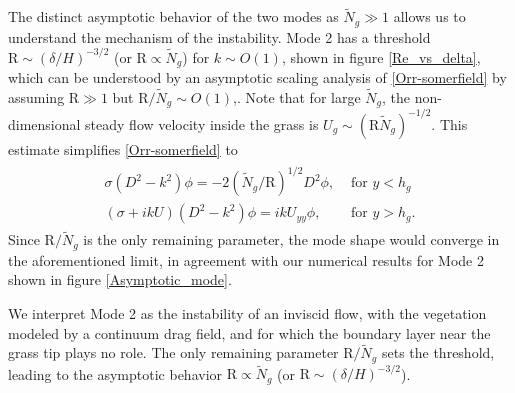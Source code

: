 \documentclass[aps,prl,twocolumn,superscriptaddress,10pt]{revtex4-1}  %
\newcommand{\hg}{h_g}
\newcommand{\Rey}{\text{R}}
\newcommand{\Ndg}{\tilde{N}_g}
\begin{document}
The distinct asymptotic behavior of the two modes as $\Ndg \gg 1$ allows us to understand the mechanism of the instability. 
Mode 2 has a threshold $\Rey \sim ({\delta}/{H})^{-3/2}$ (or $\Rey \propto \Ndg$) for $k\sim O(1)$, shown in figure \ref{Re_vs_delta}, which can be understood by an asymptotic scaling analysis of \eqref{Orr-somerfield} by assuming $\Rey \gg 1$ but $\Rey/\Ndg \sim O(1)$,.
Note that for large $\Ndg$, the non-dimensional steady flow velocity inside the grass is $U_g \sim (\Rey \Ndg)^{-1/2}$. 
This estimate simplifies \eqref{Orr-somerfield} to 
\begin{align}
\begin{split}
\sigma\left(D^2-k^2\right)\phi = -2{(\Ndg/\Rey)^{1/2}}D^2\phi,   &\text{ for $y<\hg$}  \\
\left(\sigma+ikU\right) \left(D^2-k^2\right)\phi =  ikU_{yy}\phi, &\text{ for $y>\hg$}.
\end{split}
\end{align}
Since $\Rey/\Ndg$ is the only remaining parameter, the mode shape would converge in the aforementioned limit, in agreement with our numerical results for Mode 2 shown in figure \ref{Asymptotic_mode}. 

We interpret Mode 2 as the instability of an inviscid flow, with the vegetation modeled by a continuum drag field, and for which the boundary layer near the grass tip plays no role. The only remaining parameter $\Rey/\Ndg$ 
sets the threshold, leading to the asymptotic behavior $\Rey \propto \Ndg$ (or $\Rey \sim ({\delta}/{H})^{-3/2}$).
\end{document}
